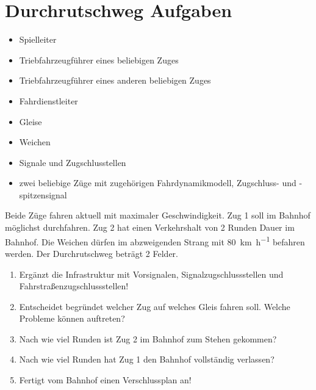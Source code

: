 

\section{Durchrutschweg Aufgaben}

  \roles
    \begin{itemize}
      \item Spielleiter
      \item Triebfahrzeugführer eines beliebigen Zuges
      \item Triebfahrzeugführer eines anderen beliebigen Zuges
      \item Fahrdienstleiter
    \end{itemize}

  \material
    \begin{itemize}
      \item Gleise
      \item Weichen
      \item Signale und Zugschlusstellen
      \item zwei beliebige Züge mit zugehörigen Fahrdynamikmodell, Zugschluss- und -spitzensignal
    \end{itemize}

  \setup
    Beide Züge fahren aktuell mit maximaler Geschwindigkeit. Zug 1 soll im Bahnhof möglichst durchfahren. Zug 2 hat einen Verkehrshalt von 2 Runden Dauer im Bahnhof. Die Weichen dürfen im abzweigenden Strang mit \SI{80}{\kilo\metre\per\hour} befahren werden. Der Durchrutschweg beträgt 2 Felder.

  \task
    \begin{enumerate}[label=\alph*)]
      \item Ergänzt die Infrastruktur mit Vorsignalen, Signalzugschlussstellen und Fahrstraßenzugschlussstellen!
      \item Entscheidet begründet welcher Zug auf welches Gleis fahren soll. Welche Probleme können auftreten?
      \item Nach wie viel Runden ist Zug 2 im Bahnhof zum Stehen gekommen?
      \item Nach wie viel Runden hat Zug 1 den Bahnhof vollständig verlassen?
      \item Fertigt vom Bahnhof einen Verschlussplan an!
    \end{enumerate}
    